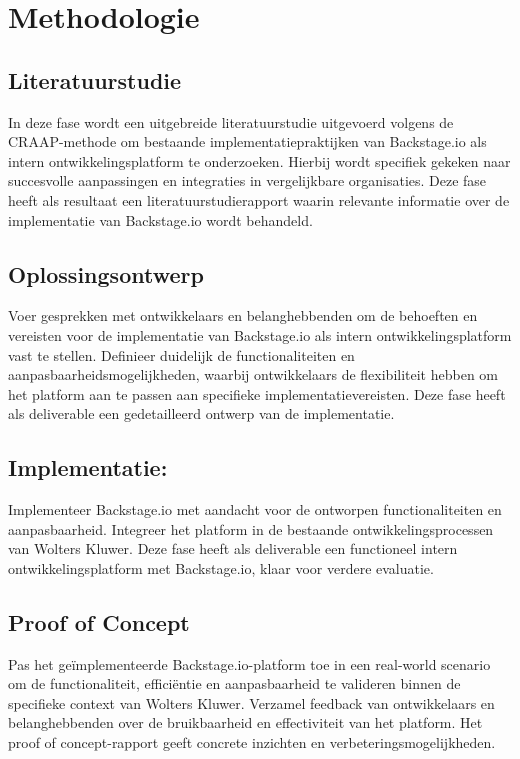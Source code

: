 \section{Methodologie}%
\label{sec:methodologie}
\subsection{Literatuurstudie}
In deze fase wordt een uitgebreide literatuurstudie uitgevoerd volgens de CRAAP-methode om bestaande implementatiepraktijken van Backstage.io als intern ontwikkelingsplatform te onderzoeken. Hierbij wordt specifiek gekeken naar succesvolle aanpassingen en integraties in vergelijkbare organisaties. Deze fase heeft als resultaat een literatuurstudierapport waarin relevante informatie over de implementatie van Backstage.io wordt behandeld.

\subsection{Oplossingsontwerp }
Voer gesprekken met ontwikkelaars en belanghebbenden om de behoeften en vereisten voor de implementatie van Backstage.io als intern ontwikkelingsplatform vast te stellen. Definieer duidelijk de functionaliteiten en aanpasbaarheidsmogelijkheden, waarbij ontwikkelaars de flexibiliteit hebben om het platform aan te passen aan specifieke implementatievereisten. Deze fase heeft als deliverable een gedetailleerd ontwerp van de implementatie.

\subsection{Implementatie:}
Implementeer Backstage.io met aandacht voor de ontworpen functionaliteiten en aanpasbaarheid. Integreer het platform in de bestaande ontwikkelingsprocessen van Wolters Kluwer. Deze fase heeft als deliverable een functioneel intern ontwikkelingsplatform met Backstage.io, klaar voor verdere evaluatie.

\subsection{Proof of Concept}
Pas het geïmplementeerde Backstage.io-platform toe in een real-world scenario om de functionaliteit, efficiëntie en aanpasbaarheid te valideren binnen de specifieke context van Wolters Kluwer. Verzamel feedback van ontwikkelaars en belanghebbenden over de bruikbaarheid en effectiviteit van het platform. Het proof of concept-rapport geeft concrete inzichten en verbeteringsmogelijkheden.

